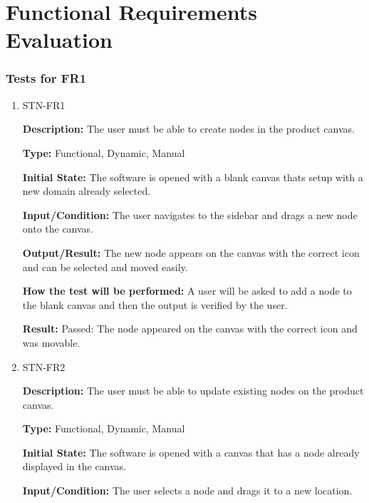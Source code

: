 \documentclass[12pt, titlepage]{article}
\begin{document}
\newpage

\tableofcontents

\listoftables %

\listoffigures %

\newpage


\section{Functional Requirements Evaluation}



\subsubsection{Tests for FR1}
\begin{enumerate}
\item{STN-FR1\\}

\textbf{Description:} The user must be able to create nodes in the product canvas.

\textbf{Type:} Functional, Dynamic, Manual

\textbf{Initial State:} The software is opened with a blank canvas thats setup with a new domain already selected.

\textbf{Input/Condition:} The user navigates to the sidebar and drags a new node onto the canvas.

\textbf{Output/Result:} The new node appears on the canvas with the correct icon and can be selected and moved easily.

\textbf{How the test will be performed:} A user will be asked to add a node to the blank canvas and then the output is verified by the user.

\textbf{Result:} Passed: The node appeared on the canvas with the correct icon and was movable.

\item{STN-FR2\\}

\textbf{Description:} The user must be able to update existing nodes on the product canvas.

\textbf{Type:} Functional, Dynamic, Manual

\textbf{Initial State:} The software is opened with a canvas that has a node already displayed in the canvas.

\textbf{Input/Condition:} The user selects a node and drags it to a new location.


\end{enumerate}
\end{document}
